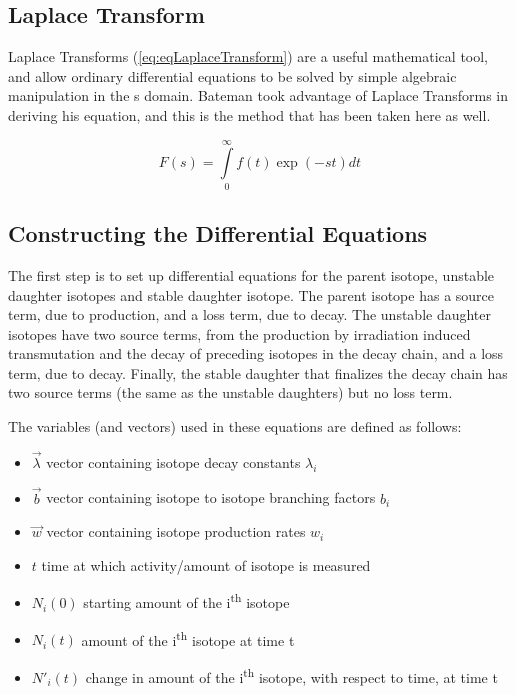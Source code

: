 \documentclass[12pt,twoside]{manual}
\begin{document}
\subsection{Laplace Transform}

Laplace Transforms (\ref{eq:eqLaplaceTransform}) are a useful mathematical tool, and allow ordinary differential equations to be solved by simple algebraic manipulation in the s domain.  Bateman took advantage of Laplace Transforms in deriving his equation, and this is the method that has been taken here as well.

\begin{equation}
  F(s) = \int \limits_{0}^{\infty} f(t) \exp(-st) dt
  \label{eq:eqLaplaceTransform}
\end{equation}


\subsection{Constructing the Differential Equations}

The first step is to set up differential equations for the parent isotope, unstable daughter isotopes and stable daughter isotope.  The parent isotope has a source term, due to production, and a loss term, due to decay.  The unstable daughter isotopes have two source terms, from the production by irradiation induced transmutation and the decay of preceding isotopes in the decay chain, and a loss term, due to decay.  Finally, the stable daughter that finalizes the decay chain has two source terms (the same as the unstable daughters) but no loss term.

The variables (and vectors) used in these equations are defined as follows:
\begin{itemize}
	\item $\vec{\lambda}$  vector containing isotope decay constants $\lambda_i$
	\item $\vec{b}$  vector containing isotope to isotope branching factors $b_i$
	\item $\vec{w}$  vector containing isotope production rates $w_i$
	\item $t$  time at which activity/amount of isotope is measured
	\item $N_{i}(0)$ starting amount of the i\textsuperscript{th} isotope
	\item $N_{i}(t)$ amount of the i\textsuperscript{th} isotope at time t
	\item $N'_{i}(t)$ change in amount of the i\textsuperscript{th} isotope, with respect to time, at time t
\end{itemize}
\end{document}
